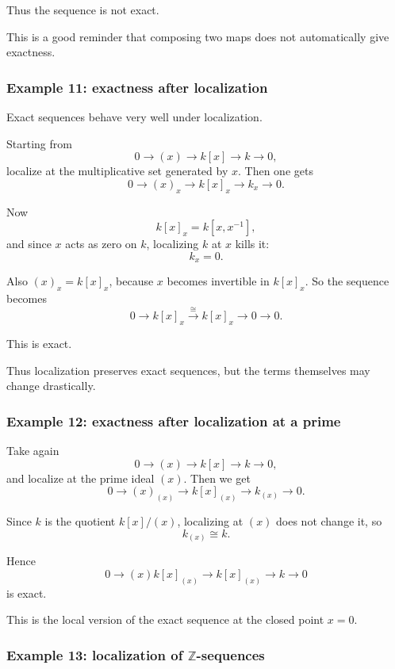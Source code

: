 \documentclass[12pt,a4paper]{article}
\theoremstyle{notespace}
\theoremstyle{definition}
\begin{document}
Thus the sequence is not exact.

This is a good reminder that composing two maps does not automatically give exactness.

\subsubsection{Example 11: exactness after localization}

Exact sequences behave very well under localization.

Starting from
\[
0 \longrightarrow (x) \longrightarrow k[x] \longrightarrow k \longrightarrow 0,
\]
localize at the multiplicative set generated by \(x\). Then one gets
\[
0 \longrightarrow (x)_x \longrightarrow k[x]_x \longrightarrow k_x \longrightarrow 0.
\]

Now
\[
k[x]_x = k[x,x^{-1}],
\]
and since \(x\) acts as zero on \(k\), localizing \(k\) at \(x\) kills it:
\[
k_x=0.
\]

Also \((x)_x = k[x]_x\), because \(x\) becomes invertible in \(k[x]_x\). So the sequence becomes
\[
0 \longrightarrow k[x]_x \xrightarrow{\cong} k[x]_x \longrightarrow 0 \longrightarrow 0.
\]

This is exact.

Thus localization preserves exact sequences, but the terms themselves may change drastically.

\subsubsection{Example 12: exactness after localization at a prime}

Take again
\[
0 \longrightarrow (x) \longrightarrow k[x] \longrightarrow k \longrightarrow 0,
\]
and localize at the prime ideal \((x)\). Then we get
\[
0 \longrightarrow (x)_{(x)} \longrightarrow k[x]_{(x)} \longrightarrow k_{(x)} \longrightarrow 0.
\]

Since \(k\) is the quotient \(k[x]/(x)\), localizing at \((x)\) does not change it, so
\[
k_{(x)}\cong k.
\]

Hence
\[
0 \longrightarrow (x)k[x]_{(x)} \longrightarrow k[x]_{(x)} \longrightarrow k \longrightarrow 0
\]
is exact.

This is the local version of the exact sequence at the closed point \(x=0\).

\subsubsection{Example 13: localization of \(\mathbb Z\)-sequences}
\end{document}
